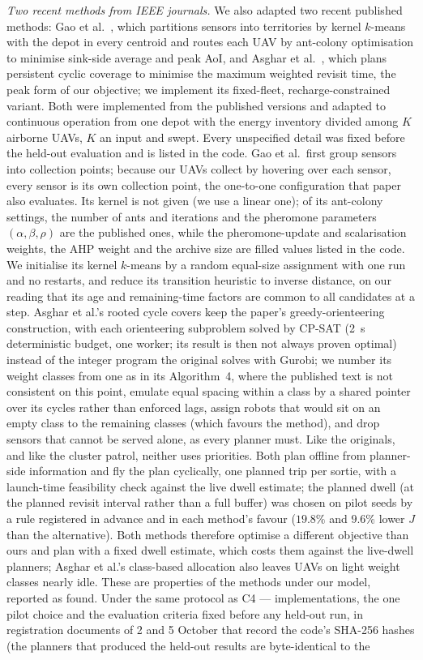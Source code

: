 \documentclass[journal,outdir=./]{IEEEtran}
\begin{document}
\textit{Two recent methods from IEEE journals.} We also adapted two recent published methods: Gao et al.\ \cite{gao2023aoi}, which partitions sensors into territories by kernel $k$-means with the depot in every centroid and routes each UAV by ant-colony optimisation to minimise sink-side average and peak AoI, and Asghar et al.\ \cite{asghar2025persistent}, which plans persistent cyclic coverage to minimise the maximum weighted revisit time, the peak form of our objective; we implement its fixed-fleet, recharge-constrained variant. Both were implemented from the published versions and adapted to continuous operation from one depot with the energy inventory divided among $K$ airborne UAVs, $K$ an input and swept. Every unspecified detail was fixed before the held-out evaluation and is listed in the code. Gao et al.\ first group sensors into collection points; because our UAVs collect by hovering over each sensor, every sensor is its own collection point, the one-to-one configuration that paper also evaluates. Its kernel is not given (we use a linear one); of its ant-colony settings, the number of ants and iterations and the pheromone parameters $(\alpha,\beta,\rho)$ are the published ones, while the pheromone-update and scalarisation weights, the AHP weight and the archive size are filled values listed in the code. We initialise its kernel $k$-means by a random equal-size assignment with one run and no restarts, and reduce its transition heuristic to inverse distance, on our reading that its age and remaining-time factors are common to all candidates at a step. Asghar et al.'s rooted cycle covers keep the paper's greedy-orienteering construction, with each orienteering subproblem solved by CP-SAT (2~s deterministic budget, one worker; its result is then not always proven optimal) instead of the integer program the original solves with Gurobi; we number its weight classes from one as in its Algorithm~4, where the published text is not consistent on this point, emulate equal spacing within a class by a shared pointer over its cycles rather than enforced lags, assign robots that would sit on an empty class to the remaining classes (which favours the method), and drop sensors that cannot be served alone, as every planner must. Like the originals, and like the cluster patrol, neither uses priorities. Both plan offline from planner-side information and fly the plan cyclically, one planned trip per sortie, with a launch-time feasibility check against the live dwell estimate; the planned dwell (at the planned revisit interval rather than a full buffer) was chosen on pilot seeds by a rule registered in advance and in each method's favour ($19.8\%$ and $9.6\%$ lower $J$ than the alternative). Both methods therefore optimise a different objective than ours and plan with a fixed dwell estimate, which costs them against the live-dwell planners; Asghar et al.'s class-based allocation also leaves UAVs on light weight classes nearly idle. These are properties of the methods under our model, reported as found. Under the same protocol as C4 --- implementations, the one pilot choice and the evaluation criteria fixed before any held-out run, in registration documents of 2 and 5 October that record the code's SHA-256 hashes (the planners that produced the held-out results are byte-identical to the 
\end{document}
